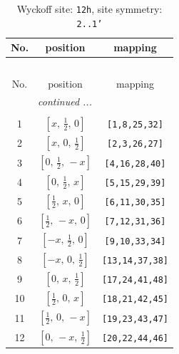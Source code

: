 \documentclass[fleqn,8pt]{jsarticle}
\begin{document}
\begin{longtable}{ccc}
\caption{Wyckoff site: {\tt 12h}, site symmetry: {\tt 2..1'}}
 \\
 \hline \hline
No. & position & mapping \\ \hline \endfirsthead

\multicolumn{2}{l}{\tablename\ \thetable{}} \\
 \hline \hline
No. & position & mapping \\ \hline \endhead

 \hline \hline
\multicolumn{2}{r}{\footnotesize\it continued ...} \\ \endfoot

 \hline \hline
\multicolumn{2}{r}{} \\ \endlastfoot

1 & $\left[ x,\, \frac{1}{2},\, 0 \right]$ & {\tt [1,8,25,32]} \\ \hline
2 & $\left[ x,\, 0,\, \frac{1}{2} \right]$ & {\tt [2,3,26,27]} \\ \hline
3 & $\left[ 0,\, \frac{1}{2},\, - x \right]$ & {\tt [4,16,28,40]} \\ \hline
4 & $\left[ 0,\, \frac{1}{2},\, x \right]$ & {\tt [5,15,29,39]} \\ \hline
5 & $\left[ \frac{1}{2},\, x,\, 0 \right]$ & {\tt [6,11,30,35]} \\ \hline
6 & $\left[ \frac{1}{2},\, - x,\, 0 \right]$ & {\tt [7,12,31,36]} \\ \hline
7 & $\left[ - x,\, \frac{1}{2},\, 0 \right]$ & {\tt [9,10,33,34]} \\ \hline
8 & $\left[ - x,\, 0,\, \frac{1}{2} \right]$ & {\tt [13,14,37,38]} \\ \hline
9 & $\left[ 0,\, x,\, \frac{1}{2} \right]$ & {\tt [17,24,41,48]} \\ \hline
10 & $\left[ \frac{1}{2},\, 0,\, x \right]$ & {\tt [18,21,42,45]} \\ \hline
11 & $\left[ \frac{1}{2},\, 0,\, - x \right]$ & {\tt [19,23,43,47]} \\ \hline
12 & $\left[ 0,\, - x,\, \frac{1}{2} \right]$ & {\tt [20,22,44,46]} \\
\end{longtable}
\renewcommand{\arraystretch}{1.2}
\end{document}
